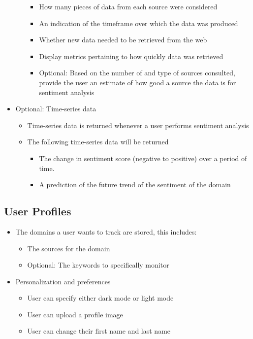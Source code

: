 \documentclass[12pt]{article}
\begin{document}
\begin{itemize}
\begin{itemize}
\begin{itemize}
                  \item How many pieces of data from each source were considered
                  \item An indication of the timeframe over which the data was produced
                  \item Whether new data needed to be retrieved from the web
                  \item Display metrics pertaining to how quickly data was retrieved
                  \item Optional: Based on the number of and type of sources consulted, provide the user an estimate of how good a source the data is for sentiment analysis
                \end{itemize}
        \end{itemize}
  \item Optional: Time-series data
        \begin{itemize}
          \item Time-series data is returned whenever a user performs sentiment analysis
          \item The following time-series data will be returned
                \begin{itemize}
                  \item The change in sentiment score (negative to positive) over a period of time.
                  \item A prediction of the future trend of the sentiment of the domain
                \end{itemize}
        \end{itemize}
\end{itemize}

\subsection{User Profiles}
\begin{itemize}
  \item The domains a user wants to track are stored, this includes:
        \begin{itemize}
          \item The sources for the domain
          \item Optional: The keywords to specifically monitor
        \end{itemize}
  \item Personalization and preferences
        \begin{itemize}
          \item User can specify either dark mode or light mode
          \item User can upload a profile image
          \item User can change their first name and last name
        \end{itemize}
\end{itemize}
\end{document}

